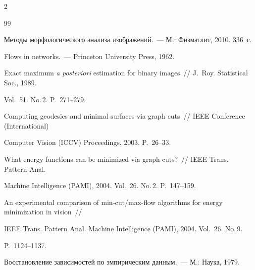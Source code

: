 \begin{multicols}{2}
{{\begin{thebibliography}{99}


Методы морфологического анализа изображений.~--- М.: Физматлит, 2010. 336~с.





Flows in networks.~--- Princeton University Press, 1962.





Exact maximum \textit{a posteriori} estimation for binary images~// J.~Roy. Statistical Soc., 1989. 

Vol.~51. No.\,2. P.~271--279.





Computing geodesics and minimal surfaces via graph cuts~// IEEE  Conference (International) 

Computer Vision (ICCV) Proceedings, 2003. P.~26--33.





What energy functions can be minimized via graph cuts?~// IEEE Trans. Pattern Anal. 

Machine Intelligence (PAMI), 2004. Vol.~26. No.\,2. P.~147--159.





An experimental comparison of min-cut/max-flow algorithms for energy minimization in vision~// 

IEEE Trans. Pattern Anal. Machine Intelligence (PAMI), 2004. Vol.~26. No.\,9. 

P.~1124--1137.





Восстановление зависимостей по эмпирическим данным.~--- М.: Наука, 1979. 






\end{thebibliography}}}
\end{multicols}
